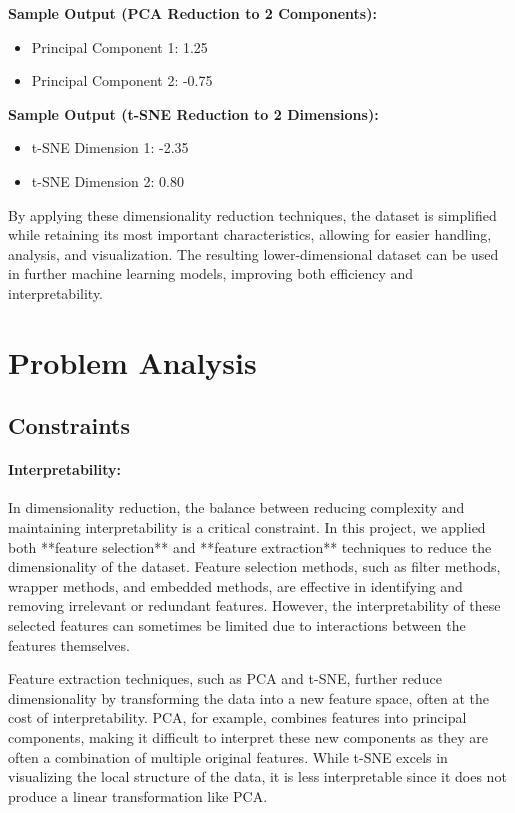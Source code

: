 \documentclass{article}
\begin{document}
\textbf{Sample Output (PCA Reduction to 2 Components):}
\begin{itemize}
    \item Principal Component 1: 1.25
    \item Principal Component 2: -0.75
\end{itemize}

\textbf{Sample Output (t-SNE Reduction to 2 Dimensions):}
\begin{itemize}
    \item t-SNE Dimension 1: -2.35
    \item t-SNE Dimension 2: 0.80
\end{itemize}

By applying these dimensionality reduction techniques, the dataset is simplified while retaining its most important characteristics, allowing for easier handling, analysis, and visualization. The resulting lower-dimensional dataset can be used in further machine learning models, improving both efficiency and interpretability.

\section{Problem Analysis}

\subsection{Constraints}

\paragraph{Interpretability:}
In dimensionality reduction, the balance between reducing complexity and maintaining interpretability is a critical constraint. In this project, we applied both **feature selection** and **feature extraction** techniques to reduce the dimensionality of the dataset. Feature selection methods, such as filter methods, wrapper methods, and embedded methods, are effective in identifying and removing irrelevant or redundant features. However, the interpretability of these selected features can sometimes be limited due to interactions between the features themselves. 

Feature extraction techniques, such as PCA and t-SNE, further reduce dimensionality by transforming the data into a new feature space, often at the cost of interpretability. PCA, for example, combines features into principal components, making it difficult to interpret these new components as they are often a combination of multiple original features. While t-SNE excels in visualizing the local structure of the data, it is less interpretable since it does not produce a linear transformation like PCA.
\end{document}
